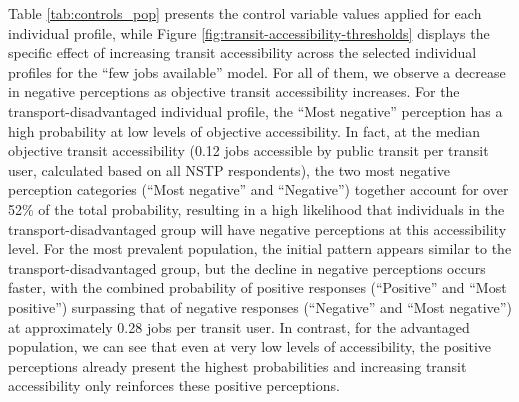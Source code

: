\documentclass[preprint, 3p,
authoryear]{elsarticle} %
\begin{document}
Table \ref{tab:controls_pop} presents the control variable values
applied for each individual profile, while Figure
\ref{fig:transit-accessibility-thresholds} displays the specific effect
of increasing transit accessibility across the selected individual
profiles for the ``few jobs available'' model. For all of them, we
observe a decrease in negative perceptions as objective transit
accessibility increases. For the transport-disadvantaged individual
profile, the ``Most negative'' perception has a high probability at low
levels of objective accessibility. In fact, at the median objective
transit accessibility (0.12 jobs accessible by public transit per
transit user, calculated based on all NSTP respondents), the two most
negative perception categories (``Most negative'' and ``Negative'')
together account for over 52\% of the total probability, resulting in a
high likelihood that individuals in the transport-disadvantaged group
will have negative perceptions at this accessibility level. For the most
prevalent population, the initial pattern appears similar to the
transport-disadvantaged group, but the decline in negative perceptions
occurs faster, with the combined probability of positive responses
(``Positive'' and ``Most positive'') surpassing that of negative
responses (``Negative'' and ``Most negative'') at approximately 0.28
jobs per transit user. In contrast, for the advantaged population, we
can see that even at very low levels of accessibility, the positive
perceptions already present the highest probabilities and increasing
transit accessibility only reinforces these positive perceptions.
\end{document}
